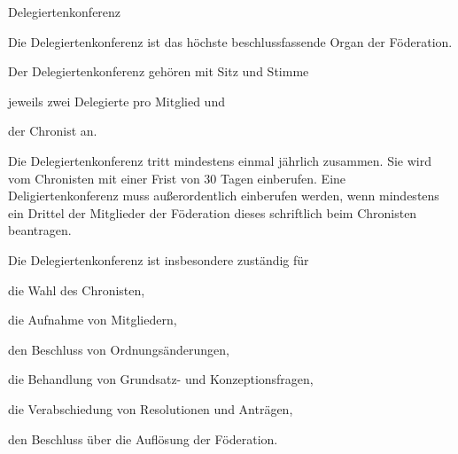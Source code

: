 \documentclass[11pt,a4paper,twoside,openany,article]{memoir}
\begin{document}
\begin{para}{Delegiertenkonferenz}
\label{p:delegiertenkonferenz}
\item Die Delegiertenkonferenz ist das höchste beschlussfassende Organ der Föderation.
\item Der Delegiertenkonferenz gehören mit Sitz und Stimme 
    \begin{subpara}
    \item jeweils zwei Delegierte pro Mitglied und
    \item der Chronist an.
    \end{subpara}
\item Die Delegiertenkonferenz tritt mindestens einmal jährlich zusammen. Sie wird vom Chronisten mit einer Frist von 30 Tagen einberufen. Eine Deligiertenkonferenz muss außerordentlich einberufen werden, wenn mindestens ein Drittel der Mitglieder der Föderation dieses schriftlich beim Chronisten beantragen.
\item Die Delegiertenkonferenz ist insbesondere zuständig für
    \begin{subpara}
    \item die Wahl des Chronisten,
    \item die Aufnahme  von Mitgliedern,
    \item den Beschluss von Ordnungsänderungen,
    \item die Behandlung von Grundsatz- und Konzeptionsfragen,
    \item die Verabschiedung von Resolutionen und Anträgen,
    \item den Beschluss über die Auflösung der Föderation.
    \end{subpara}
\end{para}
\end{document}
